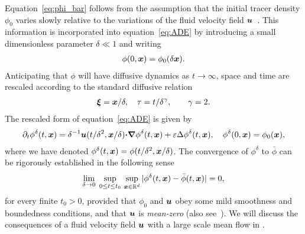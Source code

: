 \documentclass[amsa]{ipart}
\begin{document}
Equation~\eqref{eq:phi_bar}
follows from the assumption that the
initial tracer density $\phi_0$ varies slowly relative to the variations
of the fluid velocity field 
$\boldsymbol{u}$~\cite{McLaughlin:SIAM_JAM:780,Fannjiang:1997:1033,Majda:Kramer:1999:book}.
This information is incorporated into equation~\eqref{eq:ADE} by
introducing a small dimensionless parameter $\delta\ll1$ and
writing~\cite{McLaughlin:SIAM_JAM:780,Fannjiang:1997:1033,Majda:Kramer:1999:book}      
%
\begin{align}
  \phi(0,\vecx)=\phi_0(\delta\vecx). 
\end{align}
%
Anticipating that $\phi$ will have diffusive dynamics as $t\to\infty$, space and 
time are rescaled according to the standard diffusive relation
%
\begin{align}\label{eq:Fast_Vars}
  \vecxi=\vecx/\delta, \quad
  \tau= t/\delta^\gamma,
  \qquad
  \gamma=2.
\end{align}
%
The rescaled form of equation~\eqref{eq:ADE} is given
by~\cite{Majda:Kramer:1999:book}  
%
\begin{align}\label{eq:ADE_delta}
  \partial_t\phi^\delta(t,\vecx)=\delta^{-1}\vecu(t/\delta^2,\vecx/\delta)\bcdot\bnabla\phi^\delta(t,\vecx)
              +\varepsilon\Delta\phi^\delta(t,\vecx),
              \quad
             \phi^\delta(0,\vecx)=\phi_0(\vecx), 
\end{align}
%
where we have denoted $\phi^\delta(t,\boldsymbol{x})=\phi(t/\delta^2,\boldsymbol{x}/\delta)$.
The convergence of $\phi^\delta$  to $\bar{\phi}$
 can be rigorously established in the following
sense~\cite{Majda:Kramer:1999:book}   
%
\begin{align}\label{eq:Homogenization_Theorem}
  \lim_{\delta\to0}\;\sup_{0\leq t\leq t_0}\,\sup_{\vecx\in\mathbb{R}^d}
  |\phi^\delta(t,\vecx)-\bar{\phi}(t,\vecx)| =0,
\end{align}
%
for every finite $t_0>0$, provided that $\phi_0$ and $\boldsymbol{u}$ obey some
mild smoothness and boundedness conditions, and that $\boldsymbol{u}$ is
\emph{mean-zero} (also see~\cite{Pavliotis:Stuart:2008:Book}).  We
will discuss the consequences of a fluid velocity field $\boldsymbol{u}$ with a
large scale mean flow in . 
\end{document}
